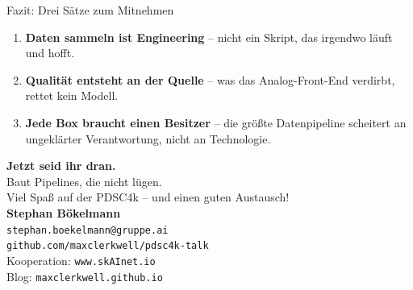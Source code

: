 \documentclass[aspectratio=169]{beamer}
\begin{document}
\begin{frame}{Fazit: Drei Sätze zum Mitnehmen}
  \begin{enumerate}
    \item \textbf{Daten sammeln ist Engineering} –
          nicht ein Skript, das irgendwo läuft und hofft.
    \item \textbf{Qualität entsteht an der Quelle} –
          was das Analog-Front-End verdirbt, rettet kein Modell.
    \item \textbf{Jede Box braucht einen Besitzer} –
          die größte Datenpipeline scheitert an ungeklärter Verantwortung,
          nicht an Technologie.
  \end{enumerate}
\end{frame}

\begin{frame}
  \begin{center}
    {\Huge \textbf{Jetzt seid ihr dran.}}\\[1em]
    {\large Baut Pipelines, die nicht lügen.}\\
    {\large Viel Spaß auf der PDSC4k – und einen guten Austausch!}\\[2em]
    \textbf{Stephan Bökelmann}\\
    \texttt{stephan.boekelmann@gruppe.ai}\\[1em]
    \small
    \texttt{github.com/maxclerkwell/pdsc4k-talk}\\[0.4em]
    Kooperation: \texttt{www.skAInet.io}\\
    Blog: \texttt{maxclerkwell.github.io}
  \end{center}
\end{frame}
\end{document}
